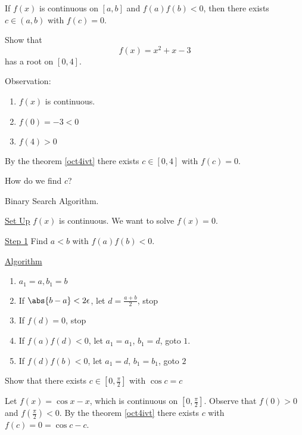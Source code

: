 
\begin{thm}
    \label{oct4ivt}
    If $f(x)$ is continuous on $[a,b]$ and $f(a)f(b)<0$, then there exists $c\in (a,b)$ with $f(c)=0$.
\end{thm}

\begin{exmp}
Show that \[f(x) = x^2+x-3\] has a root on $[0,4]$.
\end{exmp}

\begin{solution}
Observation:
\begin{enumerate}
\item $f(x)$ is continuous.
\item $f(0)= -3<0$
\item $f(4)>0$
\end{enumerate}

By the theorem \ref{oct4ivt} there exists $c\in [0,4]$ with $f(c) = 0$.
\end{solution}

\begin{ques}
How do we find $c$?
\end{ques}
\begin{solution}
Binary Search Algorithm.

\underline{Set Up} $f(x)$ is continuous. We want to solve $f(x) = 0$.

\underline{Step 1} Find $a<b$ with $f(a)f(b) < 0$.

\underline{Algorithm}

\begin{enumerate}
\item $a_1=a,b_1=b$
\item If $\abs{b-a} < 2\epsilon$, let $d = \frac{a+b}{2}$, stop
\item If $f(d)=0$, stop
\item If $f(a)f(d)<0$, let $a_1 = a_1$, $b_1 =d$, goto $1$.
\item If $f(d)f(b)<0$, let $a_1 = d$, $b_1 = b_1$, goto $2$
\end{enumerate}
\end{solution}

\begin{exmp}
Show that there exists $c\in[0,\frac{\pi}{2}]$ with $\cos c = c$
\end{exmp}

\begin{solution}
Let $f(x) = \cos x - x$, which is continuous on $[0,\frac{\pi}{2}]$. Observe that $f(0)>0$ and $f(\frac{\pi}{2}) < 0$. By the theorem \ref{oct4ivt} there exists $c$ with $f(c) = 0 = \cos c - c$.

\end{solution}


